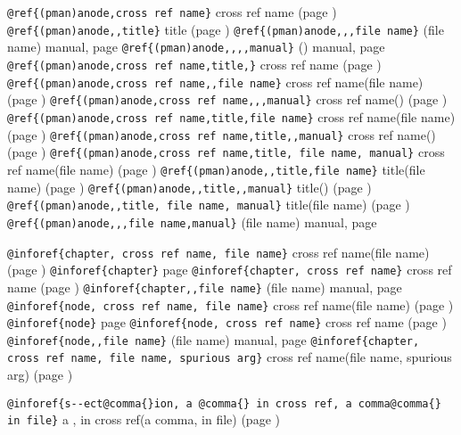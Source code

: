 \documentclass{book}
\begin{document}
\texttt{@ref\{(pman)anode,cross ref name\}} cross ref name (page \pageref{anchor:_0028pman_0029anode})
\texttt{@ref\{(pman)anode,,title\}} title (page \pageref{anchor:_0028pman_0029anode})
\texttt{@ref\{(pman)anode,,,file name\}} (file name) manual, page \pageref{anchor:_0028pman_0029anode}
\texttt{@ref\{(pman)anode,,,,manual\}} () manual, page \pageref{anchor:_0028pman_0029anode}
\texttt{@ref\{(pman)anode,cross ref name,title,\}} cross ref name (page \pageref{anchor:_0028pman_0029anode})
\texttt{@ref\{(pman)anode,cross ref name,,file name\}} cross ref name(file name) (page \pageref{anchor:_0028pman_0029anode})
\texttt{@ref\{(pman)anode,cross ref name,,,manual\}} cross ref name() (page \pageref{anchor:_0028pman_0029anode})
\texttt{@ref\{(pman)anode,cross ref name,title,file name\}} cross ref name(file name) (page \pageref{anchor:_0028pman_0029anode})
\texttt{@ref\{(pman)anode,cross ref name,title,,manual\}} cross ref name() (page \pageref{anchor:_0028pman_0029anode})
\texttt{@ref\{(pman)anode,cross ref name,title, file name, manual\}} cross ref name(file name) (page \pageref{anchor:_0028pman_0029anode})
\texttt{@ref\{(pman)anode,,title,file name\}} title(file name) (page \pageref{anchor:_0028pman_0029anode})
\texttt{@ref\{(pman)anode,,title,,manual\}} title() (page \pageref{anchor:_0028pman_0029anode})
\texttt{@ref\{(pman)anode,,title, file name, manual\}} title(file name) (page \pageref{anchor:_0028pman_0029anode})
\texttt{@ref\{(pman)anode,,,file name,manual\}} (file name) manual, page \pageref{anchor:_0028pman_0029anode}


\texttt{@inforef\{chapter, cross ref name, file name\}} cross ref name(file name) (page \pageref{anchor:chapter})
\texttt{@inforef\{chapter\}} page \pageref{anchor:chapter}
\texttt{@inforef\{chapter, cross ref name\}} cross ref name (page \pageref{anchor:chapter})
\texttt{@inforef\{chapter,,file name\}} (file name) manual, page \pageref{anchor:chapter}
\texttt{@inforef\{node, cross ref name, file name\}} cross ref name(file name) (page \pageref{anchor:node})
\texttt{@inforef\{node\}} page \pageref{anchor:node}
\texttt{@inforef\{node, cross ref name\}} cross ref name (page \pageref{anchor:node})
\texttt{@inforef\{node,,file name\}} (file name) manual, page \pageref{anchor:node}
\texttt{@inforef\{chapter, cross ref name, file name, spurious arg\}} cross ref name(file name, spurious arg) (page \pageref{anchor:chapter})

\texttt{@inforef\{s{-}{-}ect@comma\{\}ion, a @comma\{\} in cross
ref, a comma@comma\{\} in file\}}
a , in cross
ref(a comma, in file) (page \pageref{anchor:s_002d_002dect_002cion})
\end{document}
